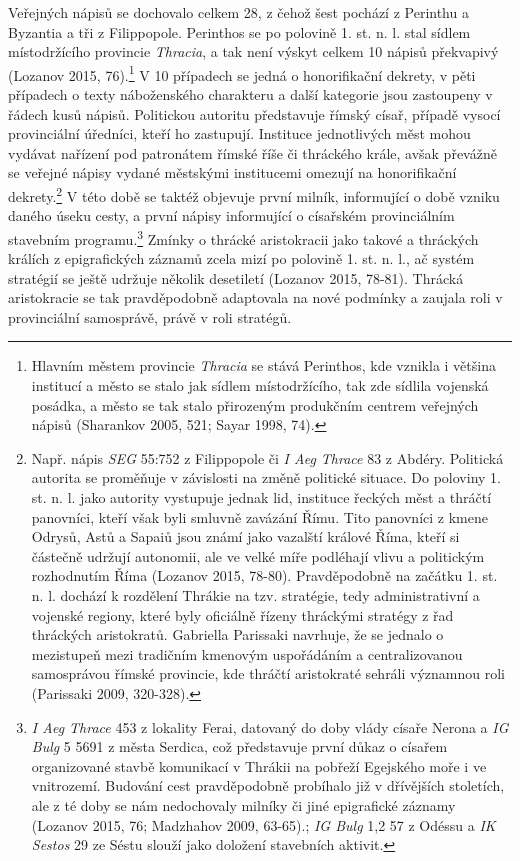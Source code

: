 Veřejných nápisů se dochovalo celkem 28, z čehož šest pochází z Perinthu a Byzantia a tři z Filippopole. Perinthos se po polovině 1. st. n. l. stal sídlem místodržícího provincie {\em Thracia}, a tak není výskyt celkem 10 nápisů překvapivý (Lozanov 2015, 76).\footnote{Hlavním městem provincie {\em Thracia} se stává Perinthos, kde vznikla i většina institucí a město se stalo jak sídlem místodržícího, tak zde sídlila vojenská posádka, a město se tak stalo přirozeným produkčním centrem veřejných nápisů (Sharankov 2005, 521; Sayar 1998, 74).} V 10 případech se jedná o honorifikační dekrety, v pěti případech o texty náboženského charakteru a další kategorie jsou zastoupeny v řádech kusů nápisů. Politickou autoritu představuje římský císař, případě vysocí provinciální úředníci, kteří ho zastupují. Instituce jednotlivých měst mohou vydávat nařízení pod patronátem římské říše či thráckého krále, avšak převážně se veřejné nápisy vydané městskými institucemi omezují na honorifikační dekrety.\footnote{Např. nápis {\em SEG} 55:752 z Filippopole či {\em I Aeg Thrace} 83 z Abdéry. Politická autorita se proměňuje v závislosti na změně politické situace. Do poloviny 1. st. n. l. jako autority vystupuje jednak lid, instituce řeckých měst a thráčtí panovníci, kteří však byli smluvně zavázání Římu. Tito panovníci z kmene Odrysů, Astů a Sapaiů jsou známí jako vazalští králové Říma, kteří si částečně udržují autonomii, ale ve velké míře podléhají vlivu a politickým rozhodnutím Říma (Lozanov 2015, 78-80). Pravděpodobně na začátku 1. st. n. l. dochází k rozdělení Thrákie na tzv. stratégie, tedy administrativní a vojenské regiony, které byly oficiálně řízeny thráckými stratégy z řad thráckých aristokratů. Gabriella Parissaki navrhuje, že se jednalo o mezistupeň mezi tradičním kmenovým uspořádáním a centralizovanou samosprávou římské provincie, kde thráčtí aristokraté sehráli významnou roli (Parissaki 2009, 320-328).} V této době se taktéž objevuje první milník, informující o době vzniku daného úseku cesty, a první nápisy informující o císařském provinciálním stavebním programu.\footnote{{\em I Aeg Thrace} 453 z lokality Ferai, datovaný do doby vlády císaře Nerona a {\em IG Bulg} 5 5691 z města Serdica, což představuje první důkaz o císařem organizované stavbě komunikací v Thrákii na pobřeží Egejského moře i ve vnitrozemí. Budování cest pravděpodobně probíhalo již v dřívějších stoletích, ale z té doby se nám nedochovaly milníky či jiné epigrafické záznamy (Lozanov 2015, 76; Madzhahov 2009, 63-65).; {\em IG Bulg} 1,2 57 z Odéssu a {\em IK Sestos} 29 ze Séstu slouží jako doložení stavebních aktivit.} Zmínky o thrácké aristokracii jako takové a thráckých králích z epigrafických záznamů zcela mizí po polovině 1. st. n. l., ač systém stratégií se ještě udržuje několik desetiletí (Lozanov 2015, 78-81). Thrácká aristokracie se tak pravděpodobně adaptovala na nové podmínky a zaujala roli v provinciální samosprávě, právě v roli stratégů.


